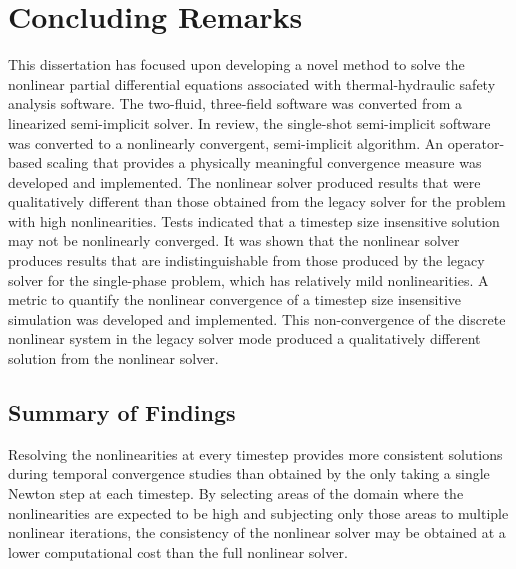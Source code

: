 \chapter{Concluding Remarks}
\label{chap:end}
This dissertation has focused upon developing a novel method to solve the nonlinear partial differential equations associated with thermal-hydraulic safety analysis software.
The two-fluid, three-field software \cobra{} was converted from a linearized semi-implicit solver.
In review, the single-shot semi-implicit \cobra{} software was converted to a nonlinearly convergent, semi-implicit algorithm.
An operator-based scaling that provides a physically meaningful convergence measure was developed and implemented.
The nonlinear solver produced results that were qualitatively different than those obtained from the legacy solver for the problem with high nonlinearities.
Tests indicated that a timestep size insensitive solution may not be nonlinearly converged.
It was shown that the nonlinear solver produces results that are indistinguishable from those produced by the legacy solver for the single-phase problem, which has relatively mild nonlinearities.
A metric to quantify the nonlinear convergence of a timestep size insensitive simulation was developed and implemented.
This non-convergence of the discrete nonlinear system in the legacy solver mode produced a qualitatively different solution from the nonlinear solver.

\section{Summary of Findings}
\label{sect:end:summary}
Resolving the nonlinearities at every timestep provides more consistent solutions during temporal convergence studies than obtained by the only taking a single Newton step at each timestep.
By selecting areas of the domain where the nonlinearities are expected to be high and subjecting only those areas to multiple nonlinear iterations, the consistency of the nonlinear solver may be obtained at a lower computational cost than the full nonlinear solver.

